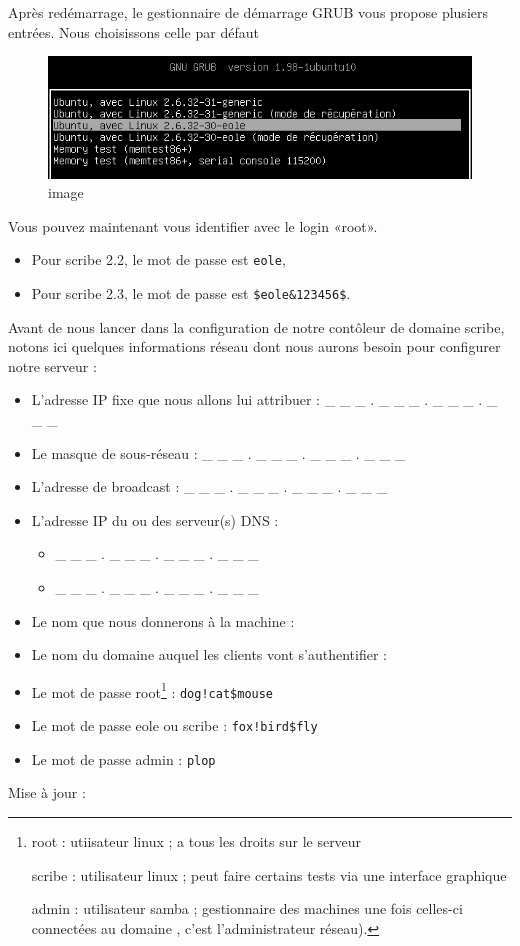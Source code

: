 \documentclass{article}
\makeatletter
\def\maxwidth{\ifdim\Gin@nat@width>\linewidth\linewidth
\else\Gin@nat@width\fi}
\let\Oldincludegraphics\includegraphics
\renewcommand{\includegraphics}[1]{\Oldincludegraphics[width=\maxwidth]{#1}}
\makeatother
\begin{document}
Après redémarrage, le gestionnaire de démarrage GRUB vous propose
plusiers entrées. Nous choisissons celle par défaut

\begin{figure}[htbp]
\centering
\includegraphics{scribe_html_m6522c87a.png}
\caption{image}
\end{figure}

Vous pouvez maintenant vous identifier avec le login «root».

\begin{itemize}
\item
  Pour scribe 2.2, le mot de passe est \lstinline!eole!,
\item
  Pour scribe 2.3, le mot de passe est \lstinline!$eole&123456$!.
\end{itemize}
Avant de nous lancer dans la configuration de notre contôleur de domaine
scribe, notons ici quelques informations réseau dont nous aurons besoin
pour configurer notre serveur :

\begin{itemize}
\item
  L'adresse IP fixe que nous allons lui attribuer : \_ \_ \_ . \_ \_ \_
  . \_ \_ \_ . \_ \_ \_
\item
  Le masque de sous-réseau : \_ \_ \_ . \_ \_ \_ . \_ \_ \_ . \_ \_ \_
\item
  L'adresse de broadcast : \_ \_ \_ . \_ \_ \_ . \_ \_ \_ . \_ \_ \_
\item
  L'adresse IP du ou des serveur(s) DNS :
  \begin{itemize}
  \item
    \_ \_ \_ . \_ \_ \_ . \_ \_ \_ . \_ \_ \_
  \item
    \_ \_ \_ . \_ \_ \_ . \_ \_ \_ . \_ \_ \_
  \end{itemize}
\item
  Le nom que nous donnerons à la machine :
\item
  Le nom du domaine auquel les clients vont s'authentifier :
\item
  Le mot de passe root\footnote{root : utiisateur linux ; a tous les
    droits sur le serveur

    scribe : utilisateur linux ; peut faire certains tests via une
    interface graphique

    admin : utilisateur samba ; gestionnaire des machines une fois
    celles-ci connectées au domaine , c'est l'administrateur réseau).} :
  \lstinline"dog!cat$mouse"
\item
  Le mot de passe eole ou scribe : \lstinline"fox!bird$fly"
\item
  Le mot de passe admin : \lstinline!plop!
\end{itemize}
Mise à jour :
\end{document}
